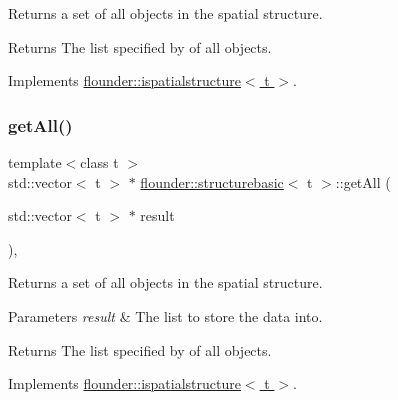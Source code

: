 Returns a set of all objects in the spatial structure. 

\begin{DoxyReturn}{Returns}
The list specified by of all objects. 
\end{DoxyReturn}


Implements \hyperlink{classflounder_1_1ispatialstructure_a481b04135e2ed57ab8f29d09301dce7e}{flounder\+::ispatialstructure$<$ t $>$}.

\mbox{\label{classflounder_1_1structurebasic_a269fcc272481b2182123523f75afb3f5}} 
\subsubsection{\texorpdfstring{get\+All()}{getAll()}\hspace{0.1cm}{\footnotesize\ttfamily [2/2]}}
{\footnotesize\ttfamily template$<$class t $>$ \\
std\+::vector$<$ t $>$ $\ast$ \hyperlink{classflounder_1_1structurebasic}{flounder\+::structurebasic}$<$ t $>$\+::get\+All (\begin{DoxyParamCaption}\item[{std\+::vector$<$ t $>$ $\ast$}]{result }\end{DoxyParamCaption})\hspace{0.3cm}{\ttfamily [override]}, {\ttfamily [virtual]}}



Returns a set of all objects in the spatial structure. 


\begin{DoxyParams}{Parameters}
{\em result} & The list to store the data into. \\
\hline
\end{DoxyParams}
\begin{DoxyReturn}{Returns}
The list specified by of all objects. 
\end{DoxyReturn}


Implements \hyperlink{classflounder_1_1ispatialstructure_adf21d28c4c648b0b97763c23f2051484}{flounder\+::ispatialstructure$<$ t $>$}.

\mbox{\label{classflounder_1_1structurebasic_aaef414a91ef6bd96982b1f7c10ae31b2}} 
